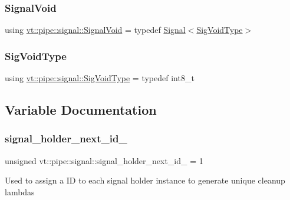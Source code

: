 \subsubsection{\texorpdfstring{Signal\+Void}{SignalVoid}}
{\footnotesize\ttfamily using \hyperlink{namespacevt_1_1pipe_1_1signal_ac80a6a95b9545fa65856842a88ac6087}{vt\+::pipe\+::signal\+::\+Signal\+Void} = typedef \hyperlink{structvt_1_1pipe_1_1signal_1_1_signal}{Signal}$<$\hyperlink{namespacevt_1_1pipe_1_1signal_acbe257d1ae44f20fa9fd9b6ed3057caf}{Sig\+Void\+Type}$>$}

\mbox{\label{namespacevt_1_1pipe_1_1signal_acbe257d1ae44f20fa9fd9b6ed3057caf}} 
\subsubsection{\texorpdfstring{Sig\+Void\+Type}{SigVoidType}}
{\footnotesize\ttfamily using \hyperlink{namespacevt_1_1pipe_1_1signal_acbe257d1ae44f20fa9fd9b6ed3057caf}{vt\+::pipe\+::signal\+::\+Sig\+Void\+Type} = typedef int8\+\_\+t}



\subsection{Variable Documentation}
\mbox{\label{namespacevt_1_1pipe_1_1signal_a31dc3a8ec5ea21eb349481eb1ca833e7}} 
\subsubsection{\texorpdfstring{signal\+\_\+holder\+\_\+next\+\_\+id\+\_\+}{signal\_holder\_next\_id\_}}
{\footnotesize\ttfamily unsigned vt\+::pipe\+::signal\+::signal\+\_\+holder\+\_\+next\+\_\+id\+\_\+ = 1}

Used to assign a ID to each signal holder instance to generate unique cleanup lambdas 